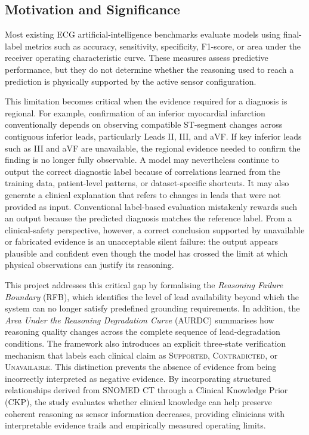 \documentclass{ssnreview}
\begin{document}
\subsection*{Motivation and Significance}

Most existing ECG artificial-intelligence benchmarks evaluate models using final-label
metrics such as accuracy, sensitivity, specificity, F1-score, or area under the receiver
operating characteristic curve. These measures assess predictive performance, but they do
not determine whether the reasoning used to reach a prediction is physically supported by the
active sensor configuration. 

This limitation becomes critical when the evidence required for a diagnosis is regional.
For example, confirmation of an inferior myocardial infarction conventionally depends on
observing compatible ST-segment changes across contiguous inferior leads, particularly
Leads II, III, and aVF. If key inferior leads such as III and aVF are unavailable, the
regional evidence needed to confirm the finding is no longer fully observable. A model may
nevertheless continue to output the correct diagnostic label because of correlations learned
from the training data, patient-level patterns, or dataset-specific shortcuts. It may also
generate a clinical explanation that refers to changes in leads that were not provided as
input. Conventional label-based evaluation mistakenly rewards such an output because the
predicted diagnosis matches the reference label. From a clinical-safety perspective,
however, a correct conclusion supported by unavailable or fabricated evidence is an
unacceptable silent failure: the output appears plausible and confident even though the
model has crossed the limit at which physical observations can justify its reasoning.

This project addresses this critical gap by formalising the \emph{Reasoning Failure
Boundary} (RFB), which identifies the level of lead availability beyond which the system can
no longer satisfy predefined grounding requirements. In addition, the \emph{Area Under the
Reasoning Degradation Curve} (AURDC) summarises how reasoning quality changes across the
complete sequence of lead-degradation conditions. The framework also introduces an explicit
three-state verification mechanism that labels each clinical claim as \textsc{Supported},
\textsc{Contradicted}, or \textsc{Unavailable}. This distinction prevents the absence of
evidence from being incorrectly interpreted as negative evidence. By incorporating
structured relationships derived from SNOMED CT through a Clinical Knowledge Prior (CKP),
the study evaluates whether clinical knowledge can help preserve coherent reasoning as sensor
information decreases, providing clinicians with interpretable evidence trails and
empirically measured operating limits.
\end{document}
